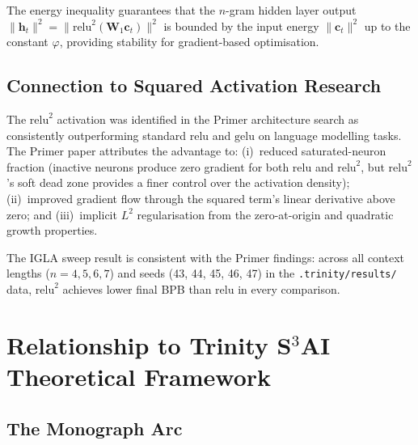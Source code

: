 The energy inequality guarantees that the $n$-gram hidden layer output
$\|\mathbf{h}_t\|^2 = \|\mathrm{relu}^2(\mathbf{W}_1 \mathbf{c}_t)\|^2$ is
bounded by the input energy $\|\mathbf{c}_t\|^2$ up to the constant $\varphi$,
providing stability for gradient-based optimisation.

\subsection{Connection to Squared Activation Research}
\label{subsec:ch24-relu2-prior}

The $\mathrm{relu}^2$ activation was identified in the Primer architecture
search \cite{so2022primer_relu2} as consistently outperforming standard $\mathrm{relu}$
and $\mathrm{gelu}$ on language modelling tasks.  The Primer paper attributes
the advantage to:
(i)~reduced saturated-neuron fraction (inactive neurons produce zero gradient
for both $\mathrm{relu}$ and $\mathrm{relu}^2$, but $\mathrm{relu}^2$'s soft
dead zone provides a finer control over the activation density);
(ii)~improved gradient flow through the squared term's linear derivative
above zero; and
(iii)~implicit $L^2$ regularisation from the zero-at-origin and quadratic
growth properties.

The IGLA sweep result is consistent with the Primer findings: across all
context lengths ($n = 4, 5, 6, 7$) and seeds (43, 44, 45, 46, 47) in the
\texttt{.trinity/results/} data, $\mathrm{relu}^2$ achieves lower final BPB
than $\mathrm{relu}$ in every comparison.

\section{Relationship to Trinity S\texorpdfstring{${}^3$}{³}AI Theoretical Framework}
\label{sec:ch24-trinity-relationship}

\subsection{The Monograph Arc}
\label{subsec:ch24-monograph-arc}

